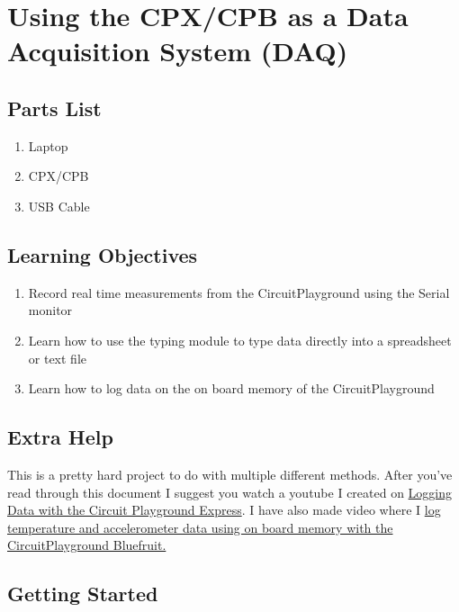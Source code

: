 \newpage

\section{Using the CPX/CPB as a Data Acquisition System (DAQ)}
\label{s:daq}

\subsection{Parts List}

\begin{enumerate}[itemsep=-5pt]
\item Laptop
\item CPX/CPB
\item USB Cable
\end{enumerate}

\subsection{Learning Objectives}
\begin{enumerate}[itemsep=-5pt]
\item Record real time measurements from the CircuitPlayground using the Serial monitor
\item Learn how to use the typing module to type data directly into a spreadsheet or text file
\item Learn how to log data on the on board memory of the CircuitPlayground 
\end{enumerate}

\subsection{Extra Help}

This is a pretty hard project to do with multiple different
methods. After you’ve read through this document I suggest you watch
a youtube I created on \href{https://youtu.be/yX0zeIfn2j4}{Logging Data with the Circuit Playground
Express}. I have also made video where I \href{https://www.youtube.com/watch?v=Vc7_KxRnORI}{log temperature and
accelerometer data using on board memory with the CircuitPlayground
Bluefruit.}

\subsection{Getting Started}

